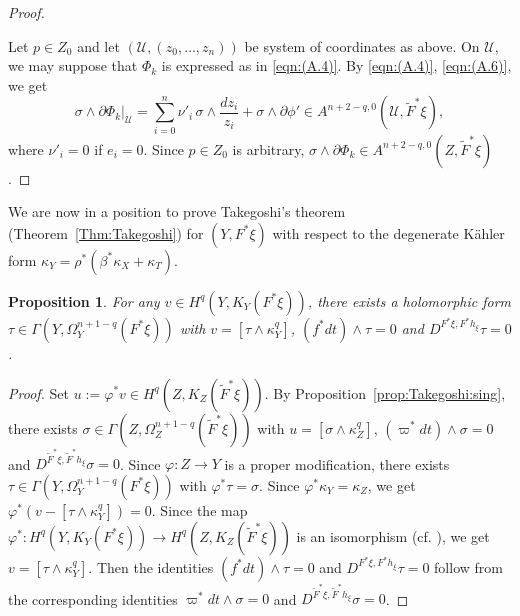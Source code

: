 \documentclass[amscd, leqno]{amsart}
\theoremstyle{plain}
\newtheorem{proposition}[theorem]{Proposition}
\theoremstyle{definition}
\theoremstyle{remark}
\newenvironment{pf}{\begin{proof}}{\end{proof}}
\begin{document}
\begin{pf}
\begin{equation}
\end{equation}
\par
Let $p\in Z_{0}$ and let $({\mathcal U},(z_{0},\ldots,z_{n}))$ be system of coordinates as above. 
On ${\mathcal U}$, we may suppose that $\Phi_{k}$ is expressed as in \eqref{eqn:(A.4)}.
By \eqref{eqn:(A.4)}, \eqref{eqn:(A.6)}, we get
$$
\sigma \wedge \partial\Phi_{k} |_{\mathcal U} = \sum_{i=0}^{n} \nu'_{i}\,\sigma \wedge \frac{dz_{i}}{z_{i}} + \sigma\wedge\partial\phi'
\in A^{n+2-q,0}({\mathcal U},\widetilde{F}^{*}\xi),
$$
where $\nu'_{i}=0$ if $e_{i}=0$. Since $p\in Z_{0}$ is arbitrary, $\sigma\wedge\partial\Phi_{k} \in A^{n+2-q,0}(Z, \widetilde{F}^{*}\xi)$.
\end{pf}


We are now in a position to prove Takegoshi's theorem (Theorem~\ref{Thm:Takegoshi}) for $(Y,F^{*}\xi)$ with respect to 
the degenerate K\"ahler form $\kappa_{Y} = \rho^{*}( \beta^{*}\kappa_{X} + \kappa_{T} )$.


\begin{proposition}
\label{prop:Takegoshi:sing:2}
For any $v\in H^{q}(Y, K_{Y}(F^{*}\xi))$, there exists a holomorphic form $\tau \in \Gamma(Y, \Omega_{Y}^{n+1-q}(F^{*}\xi))$ 
with $v=[\tau\wedge\kappa_{Y}^{q}]$, $(f^{*}dt)\wedge\tau=0$ and $D^{F^{*}\xi, F^{*}h_{\xi}} \tau =0$.
\end{proposition}

\begin{pf}
Set $u := \varphi^{*}v\in H^{q}(Z, K_{Z}(\widetilde{F}^{*}\xi))$. 
By Proposition~\ref{prop:Takegoshi:sing}, there exists $\sigma \in \Gamma(Z,\Omega_{Z}^{n+1-q}(\widetilde{F}^{*}\xi))$ with $u=[\sigma\wedge\kappa_{Z}^{q}]$, $(\varpi^{*}dt)\wedge\sigma=0$ and $D^{\widetilde{F}^{*}\xi, \widetilde{F}^{*}h_{\xi}} \sigma =0$. 
Since $\varphi \colon Z \to Y$ is a proper modification, there exists $\tau \in \Gamma(Y,\Omega_{Y}^{n+1-q}(F^{*}\xi))$ with 
$\varphi^{*}\tau=\sigma$. Since $\varphi^{*}\kappa_{Y}=\kappa_{Z}$, we get $\varphi^{*}( v - [\tau\wedge\kappa_{Y}^{q}] ) = 0$. 
Since the map $\varphi^{*}\colon H^{q}(Y, K_{Y}(F^{*}\xi))\to H^{q}(Z, K_{Z}(\widetilde{F}^{*}\xi))$ is an isomorphism 
(cf. \cite[Theorem I, II]{Takegoshi95}), 
we get $v=[\tau\wedge\kappa_{Y}^{q}]$. Then the identities $(f^{*}dt) \wedge \tau = 0$ and $D^{F^{*}\xi, F^{*}h_{\xi}} \tau = 0$ follow from 
the corresponding identities $\varpi^{*}dt \wedge \sigma =0$ and $D^{\widetilde{F}^{*}\xi, \widetilde{F}^{*}h_{\xi}} \sigma =0$. 
\end{pf}
\end{document}
